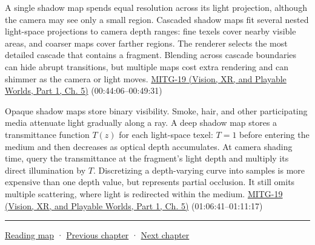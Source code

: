 A single shadow map spends equal resolution across its light projection, although the camera may see only a small region. Cascaded shadow maps fit several nested light-space projections to camera depth ranges: fine texels cover nearby visible areas, and coarser maps cover farther regions. The renderer selects the most detailed cascade that contains a fragment. Blending across cascade boundaries can hide abrupt transitions, but multiple maps cost extra rendering and can shimmer as the camera or light moves. \href{../07-Vision-XR-and-Playable-Worlds-P01/main.pdf\#nameddest=04-visual-computing-ii-ch036-mitg-19---shadow-maps}{MITG-19 (Vision, XR, and Playable Worlds, Part 1, Ch. 5)} (00:44:06--00:49:31)

Opaque shadow maps store binary visibility. Smoke, hair, and other participating media attenuate light gradually along a ray. A deep shadow map stores a transmittance function \(T(z)\) for each light-space texel: \(T=1\) before entering the medium and then decreases as optical depth accumulates. At camera shading time, query the transmittance at the fragment's light depth and multiply its direct illumination by \(T\). Discretizing a depth-varying curve into samples is more expensive than one depth value, but represents partial occlusion. It still omits multiple scattering, where light is redirected within the medium. \href{../07-Vision-XR-and-Playable-Worlds-P01/main.pdf\#nameddest=04-visual-computing-ii-ch036-mitg-19---shadow-maps}{MITG-19 (Vision, XR, and Playable Worlds, Part 1, Ch. 5)} (01:06:41--01:11:17)

\begin{center}\rule{0.5\linewidth}{0.5pt}\end{center}

\hyperref[volume-reading-map]{Reading map} · \hyperref[04-visual-computing-ii-ch027-mesh-queries-classification-and-clipping]{Previous chapter} · \hyperref[04-visual-computing-ii-ch029-acceleration-structures-and-robust-queries]{Next chapter}
